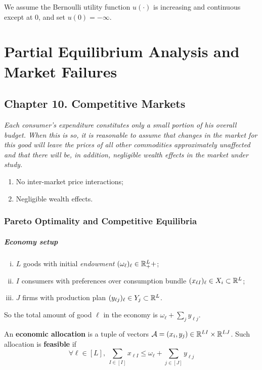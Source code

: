 \documentclass{report}
\begin{document}
	 		\begin{assumption}
	 			We assume the Bernoulli utility function $u(\cdot)$ is increasing and continuous except at $0$, and set $u(0) = -\infty$.
	 		\end{assumption}
	 
	 \chapter{Partial Equilibrium Analysis and Market Failures}
	 \section{Chapter 10. Competitive Markets}
	 	\begin{assumption}
	 		\emph{Each consumer's expenditure constitutes only a small portion of his overall budget. When this is so, it is reasonable to assume that changes in the market for this good will leave the prices of all other commodities approximately unaffected and that there will be, in addition, negligible wealth effects in the market under study.}
	 		\begin{enumerate}
	 			\item No inter-market price interactions;
	 			\item Negligible wealth effects.
	 		\end{enumerate}
	 	\end{assumption}
	 	
	 	\subsection{Pareto Optimality and Competitive Equilibria}
	 	\paragraph{Economy setup}
	 	\begin{enumerate}[(i)]
	 		\item $L$ goods with initial \emph{endowment} $(\omega_\ell)_\ell \in \mathbb{R}^L_++$;
	 		\item $I$ consumers with preferences over consumption bundle $(x_{\ell I})_\ell \in X_i \subset \mathbb{R}^L$;
	 		\item $J$ firms with production plan $(y_{\ell j})_\ell \in Y_j \subset \mathbb{R}^L$.
	 	\end{enumerate}
	 	So the total amount of good $\ell$ in the economy is $\omega_\ell + \sum_j y_{\ell j}$.
	 	
	 	\begin{definition}[10.B.1]
	 		An \textbf{economic allocation} is a tuple of vectors $\mathcal{{A}} = (x_i, y_j) \in \mathbb{R}^{LI} \times \mathbb{R}^{LJ}$. Such allocation is \textbf{feasible} if
	 		\begin{equation}
	 			\forall \ell \in [L],\ \sum_{I \in [I]} x_{\ell I} \leq \omega_\ell + \sum_{j \in [J]} y_{\ell j}
	 		\end{equation}
	 	\end{definition}
	 	
\end{document}

